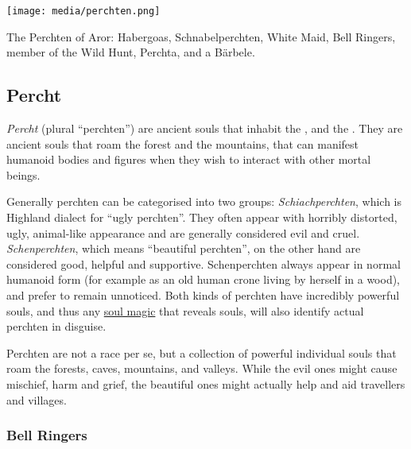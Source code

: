 \begin{figure*}[ht!]
    \centering
    \vspace{-2.6cm}
    \centerline{
        \texttt{[image: media/perchten.png]}
    }
    \par
    The Perchten of Aror: Habergoas, Schnabelperchten, White Maid, Bell
    Ringers, member of the Wild Hunt, Perchta, and a Bärbele.
\end{figure*}

\subsection{Percht}
\label{sec:Percht}

\emph{Percht} (plural ``perchten'') are ancient souls that inhabit the
, and the . They
are ancient souls that roam the forest and the mountains, that can manifest
humanoid bodies and figures when they wish to interact with other mortal
beings.

Generally perchten can be categorised into two groups: \emph{Schiachperchten},
which is Highland dialect for ``ugly perchten''. They often appear with
horribly distorted, ugly, animal-like appearance and are generally considered
evil and cruel. \emph{Schenperchten}, which means ``beautiful perchten'', on
the other hand are considered good, helpful and supportive. Schenperchten
always appear in normal humanoid form (for example as an old human crone
living by herself in a wood), and prefer to remain unnoticed. Both kinds of
perchten have incredibly powerful souls, and thus any \hyperref[sec:Soul
  Magic]{soul magic} that reveals souls, will also identify actual perchten in
disguise.

Perchten are not a race per se, but a collection of powerful individual souls
that roam the forests, caves, mountains, and valleys. While the evil ones might
cause mischief, harm and grief, the beautiful ones might actually help and aid
travellers and villages.

\subsubsection{Bell Ringers}
\label{sec:Bell Ringers}

